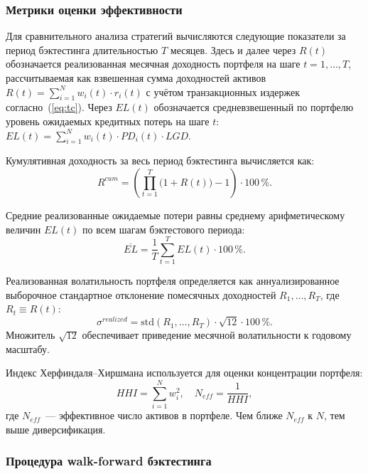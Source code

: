 \documentclass[]{article}
\begin{document}
	\subsubsection{Метрики оценки эффективности}

	Для сравнительного анализа стратегий вычисляются следующие показатели за период бэктестинга
	длительностью $T$ месяцев. Здесь и далее через $R(t)$ обозначается реализованная месячная
	доходность портфеля на шаге $t = 1, \ldots, T$, рассчитываемая как взвешенная сумма
	доходностей активов $R(t) = \sum_{i=1}^{N} w_i(t) \cdot r_i(t)$ с учётом транзакционных
	издержек согласно~(\ref{eq:tc}). Через $EL(t)$ обозначается средневзвешенный по портфелю
	уровень ожидаемых кредитных потерь на шаге $t$:
	$EL(t) = \sum_{i=1}^{N} w_i(t) \cdot PD_i(t) \cdot LGD$.

	Кумулятивная доходность за весь период бэктестинга вычисляется как:
	\begin{equation}
		R^{cum} = \left( \prod_{t=1}^T \bigl(1 + R(t)\bigr) - 1 \right) \cdot 100\,\%.
	\end{equation}

	Средние реализованные ожидаемые потери равны среднему арифметическому величин $EL(t)$ по
	всем шагам бэктестового периода:
	\begin{equation}
		\overline{EL} = \frac{1}{T} \sum_{t=1}^T EL(t) \cdot 100\,\%.
	\end{equation}

	Реализованная волатильность портфеля определяется как аннуализированное выборочное
	стандартное отклонение помесячных доходностей $R_1, \ldots, R_T$, где $R_t \equiv R(t)$:
	\begin{equation}
		\sigma^{realized} = \mathrm{std}(R_1, \ldots, R_T) \cdot \sqrt{12} \cdot 100\,\%.
	\end{equation}
	Множитель $\sqrt{12}$ обеспечивает приведение месячной волатильности к годовому масштабу.

	Индекс Херфиндаля--Хиршмана используется для оценки концентрации портфеля:
	\begin{equation}
		HHI = \sum_{i=1}^N w_i^2, \quad N_{eff} = \frac{1}{HHI},
	\end{equation}
	где $N_{eff}$~--- эффективное число активов в портфеле. Чем ближе $N_{eff}$ к $N$, тем выше
	диверсификация.

	\subsubsection{Процедура walk-forward бэктестинга}
\end{document}
